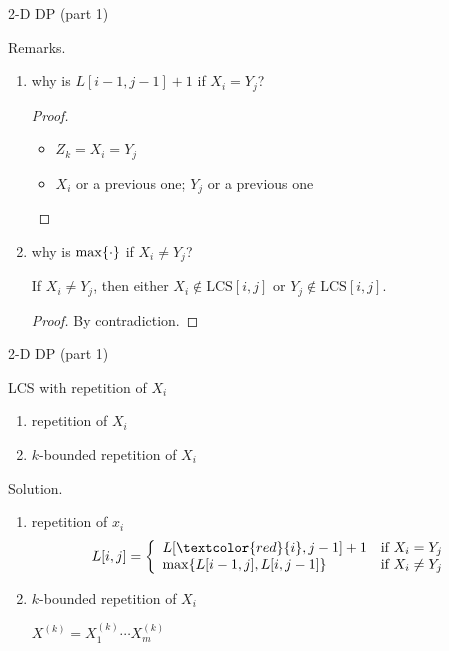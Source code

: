 \begin{frame}{2-D DP (part 1)}
  \begin{alertblock}{Remarks.}
    \begin{enumerate}
      \item why is $L[i-1,j-1] + 1$ if $X_{i} = Y_{j}$?
	\begin{proof}
	  \begin{itemize}
	    \item $Z_{k} = X_{i} = Y_{j}$
	    \item $X_{i}$ or a previous one; $Y_{j}$ or a previous one
	  \end{itemize}
	\end{proof}
      \item why is $\max \{\cdot\}$ if $X_{i} \neq Y_{j}$?
	\begin{theorem}{}
	  If $X_{i} \neq Y_{j}$, then either $X_{i} \notin \text{LCS}[i,j]$ or $Y_{j} \notin \text{LCS}[i,j]$.
	\end{theorem}
	\begin{proof}
	  By contradiction.
	\end{proof}
    \end{enumerate}
  \end{alertblock}
\end{frame}
\begin{frame}{2-D DP (part 1)}
  \begin{exampleblock}{LCS with repetition of $X_{i}$ }
    \begin{enumerate}
      \item repetition of $X_{i}$
      \item $k$-bounded repetition of $X_{i}$
    \end{enumerate}
  \end{exampleblock}

  \begin{block}{Solution.}
    \begin{enumerate}
      \item repetition of $x_{i}$
	\begin{displaymath}
	  L[i,j] = \left\{ \begin{array}{ll}
	    L[\textcolor{red}{i}, j-1] + 1 & \textrm{if $X_{i} = Y_{j}$}\\
	    \max \set{L[i-1,j], L[i,j-1]} & \textrm{if $X_{i} \neq Y_{j}$}
	  \end{array} \right.
	\end{displaymath}
      \item $k$-bounded repetition of $X_{i}$

	$X^{(k)} = X_{1}^{(k)} \cdots X_{m}^{(k)}$
    \end{enumerate}
  \end{block}
\end{frame}
